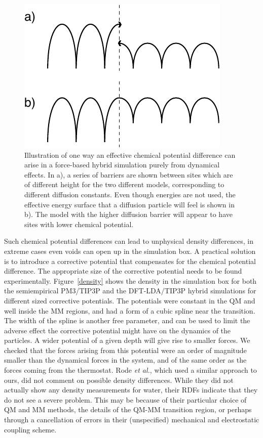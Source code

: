 \documentclass[11pt]{revtex4}
\begin{document}
\begin{figure}
\includegraphics{diffusion}
\caption{Illustration of one way an effective chemical potential difference can arise in a force-based hybrid simulation purely from dynamical effects. In a), a series of barriers are shown between sites which are of different height for the two different models, corresponding to different diffusion constants. Even though energies are not used, the effective energy surface that a diffusion particle will feel is shown in b). The model with the higher diffusion barrier will appear to have sites with lower chemical potential. }
\label{diffusion_sketch}
\end{figure}

Such chemical potential differences can lead to unphysical density differences, in extreme cases even voids can open up in the simulation box. A practical solution is to introduce a corrective potential that compensates for the chemical potential difference. The appropriate size of the corrective potential needs to be found experimentally. Figure~\ref{density} shows the density in the simulation box for both the semiempirical PM3/TIP3P and the DFT-LDA/TIP3P hybrid simulations for different sized corrective potentials. The potentials were constant in the QM and well inside the MM regions, and had a form of a cubic spline near the transition. The width of the spline is another free parameter, and can be used to limit the adverse effect the corrective potential might have on the dynamics of the particles. A wider potential of a given depth will give rise to smaller forces. We checked that the forces arising from this potential were an order of magnitude smaller than the dynamical forces in the system, and of the same order as the forces coming from the thermostat.  Rode {\it et al.}, which used a similar approach to ours, did not comment on possible density differences.  While they did not actually show any density measurements for water\cite{xenides_j_chem_phys_2005a,xenides_j_mol_liq_2006a}, their RDFs indicate that they do not see a severe problem.  This may be because of their particular choice of QM and MM methods, the details of the QM-MM transition region, or perhaps through a cancellation of errors in their (unspecified) mechanical and electrostatic coupling scheme.
\end{document}
